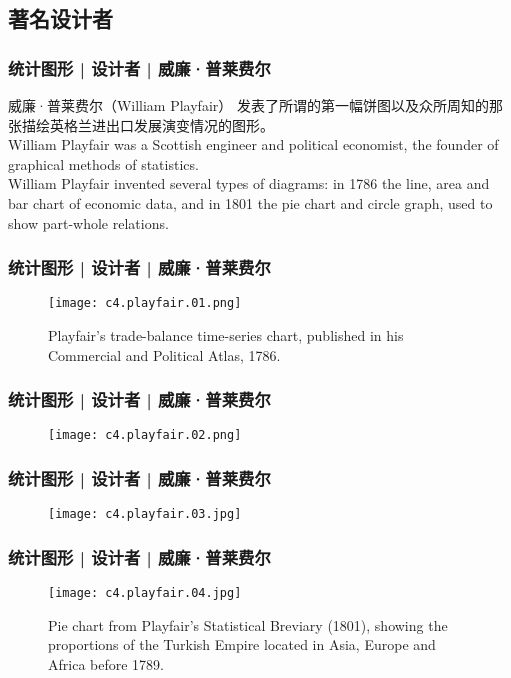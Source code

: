 \subsection{著名设计者}
\begin{frame}
  \frametitle{统计图形 | 设计者 | 威廉·普莱费尔}
  \begin{block}{威廉·普莱费尔（William Playfair）}
    发表了所谓的第一幅饼图以及众所周知的那张描绘英格兰进出口发展演变情况的图形。\\
    \vspace{0.5em}
    William Playfair was a Scottish engineer and political economist, the founder of graphical methods of statistics.\\
    \vspace{0.5em}
    William Playfair invented several types of diagrams: in 1786 the line, area and bar chart of economic data, and in 1801 the pie chart and circle graph, used to show part-whole relations.
  \end{block}
\end{frame}

\begin{frame}
  \frametitle{统计图形 | 设计者 | 威廉·普莱费尔}
  \begin{figure}
    \centering
    \texttt{[image: c4.playfair.01.png]}
    \caption{Playfair's trade-balance time-series chart, published in his Commercial and Political Atlas, 1786.}
  \end{figure}
\end{frame}

\begin{frame}
  \frametitle{统计图形 | 设计者 | 威廉·普莱费尔}
  \begin{figure}
    \centering
    \texttt{[image: c4.playfair.02.png]}
  \end{figure}
\end{frame}

\begin{frame}
  \frametitle{统计图形 | 设计者 | 威廉·普莱费尔}
  \begin{figure}
    \centering
    \texttt{[image: c4.playfair.03.jpg]}
  \end{figure}
\end{frame}

\begin{frame}
  \frametitle{统计图形 | 设计者 | 威廉·普莱费尔}
  \begin{figure}
    \centering
    \texttt{[image: c4.playfair.04.jpg]}
    \caption{Pie chart from Playfair's Statistical Breviary (1801), showing the proportions of the Turkish Empire located in Asia, Europe and Africa before 1789.}
  \end{figure}
\end{frame}

